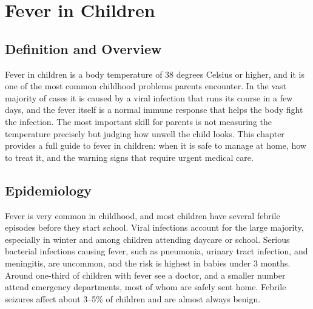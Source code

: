\chapter{Fever in Children}

\section*{Definition and Overview}
Fever in children is a body temperature of 38 degrees Celsius or higher, and it is one of the most common childhood problems parents encounter. In the vast majority of cases it is caused by a viral infection that runs its course in a few days, and the fever itself is a normal immune response that helps the body fight the infection. The most important skill for parents is not measuring the temperature precisely but judging how unwell the child looks. This chapter provides a full guide to fever in children: when it is safe to manage at home, how to treat it, and the warning signs that require urgent medical care.

\section*{Epidemiology}
Fever is very common in childhood, and most children have several febrile episodes before they start school. Viral infections account for the large majority, especially in winter and among children attending daycare or school. Serious bacterial infections causing fever, such as pneumonia, urinary tract infection, and meningitis, are uncommon, and the risk is highest in babies under 3 months. Around one-third of children with fever see a doctor, and a smaller number attend emergency departments, most of whom are safely sent home. Febrile seizures affect about 3--5\% of children and are almost always benign.

